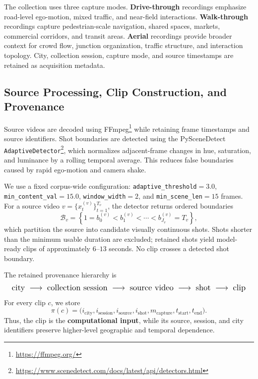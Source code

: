 The collection uses three capture modes. \textbf{Drive-through}
recordings emphasize road-level ego-motion, mixed traffic, and
near-field interactions. \textbf{Walk-through} recordings capture
pedestrian-scale navigation, shared spaces, markets, commercial
corridors, and transit areas. \textbf{Aerial} recordings provide broader
context for crowd flow, junction organization, traffic structure, and
interaction topology. City, collection session, capture mode, and
source timestamps are retained as acquisition metadata.

\subsection{Source Processing, Clip Construction, and Provenance}
\label{app:clip_construction}

Source videos are decoded using
FFmpeg\footnote{\url{https://ffmpeg.org/}} while retaining frame
timestamps and source identifiers. Shot boundaries are detected using
the PySceneDetect
\texttt{AdaptiveDetector}\footnote{\url{https://www.scenedetect.com/docs/latest/api/detectors.html}},
which normalizes adjacent-frame changes in hue, saturation, and
luminance by a rolling temporal average. This reduces false boundaries
caused by rapid ego-motion and camera shake.

We use a fixed corpus-wide configuration:
\texttt{adaptive\_threshold}$=3.0$,
\texttt{min\_content\_val}$=15.0$,
\texttt{window\_width}$=2$, and
\texttt{min\_scene\_len}$=15$ frames. For a source video
\(v=\{x^{(v)}_t\}_{t=1}^{T_v}\), the detector returns ordered
boundaries
\begin{equation*}
\mathcal B_v
=
\left\{
1=b^{(v)}_0
<
b^{(v)}_1
<
\cdots
<
b^{(v)}_{J_v}=T_v
\right\},
\end{equation*}
which partition the source into candidate visually continuous shots.
Shots shorter than the minimum usable duration are excluded; retained
shots yield model-ready clips of approximately \(6\)--\(13\) seconds.
No clip crosses a detected shot boundary.

The retained provenance hierarchy is
\begin{equation*}
\resizebox{0.98\columnwidth}{!}{$\displaystyle
\text{city}
\;\longrightarrow\;
\text{collection session}
\;\longrightarrow\;
\text{source video}
\;\longrightarrow\;
\text{shot}
\;\longrightarrow\;
\text{clip}
$}
\end{equation*}
For every clip \(c\), we store
\begin{equation*}
\pi(c)=
\bigl(
i_{\mathrm{city}},
i_{\mathrm{session}},
i_{\mathrm{source}},
i_{\mathrm{shot}},
m_{\mathrm{capture}},
t_{\mathrm{start}},
t_{\mathrm{end}}
\bigr).
\end{equation*}
Thus, the clip is the \textbf{computational input}, while its source,
session, and city identifiers preserve higher-level geographic and
temporal dependence.

